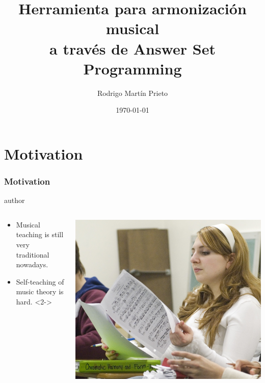 \documentclass[english]{beamer}
\title[Harmonization through ASP]{Herramienta para armonización musical\\a través de Answer Set Programming}
\author[Rodrigo Martín Prieto]{Rodrigo Martín Prieto}
\institute[UDC] {
Universidade da Coruña \\ %
\medskip
\textit{r.martin@udc.es} %
}
\date{\today} %
\begin{document}
\begin{frame}
\titlepage %
\end{frame}


\section{Motivation}
\begin{frame}
	\frametitle{Motivation}
			\begin{beamercolorbox}[leftskip=8cm,center,wd=0.7\textwidth]{author}
			\begin{columns}[T]
			\begin{column}{.60\textwidth}%
				\begin{itemize}
						\item \alert{Musical teaching} is still very traditional nowadays.
						\item Self-teaching of \alert{music theory} is hard.
						<2->
				\end{itemize}
			\end{column}
			\begin{column}{.39\textwidth}%
			\includegraphics[width=\linewidth]{imagenes/student-in-class.jpg}
			\end{column}
			\end{columns}
			\end{beamercolorbox}

\end{frame}
\end{document}
